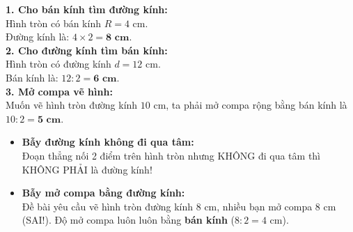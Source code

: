 \documentclass[12pt,a4paper]{article}
\begin{document}
\vspace{-2.5mm}
\noindent
\begin{minipage}[t]{0.49\textwidth}\vspace{0pt}
\begin{tcolorbox}[
  enhanced,
  colback=green!4!white,
  colframe=green!60!black,
  arc=2mm, boxrule=0.8pt,
  left=2mm, right=2mm, top=1.8mm, bottom=1.8mm,
  title={\footnotesize\bfseries\color{white}\faCheckCircle\ Ví dụ thực hành chuẩn mực}
]
{\footnotesize
\textbf{1. Cho bán kính tìm đường kính:}\\
Hình tròn có bán kính $R = 4\text{ cm}$.\\
Đường kính là: $4 \times 2 = \mathbf{8\text{ cm}}$.\\
\textbf{2. Cho đường kính tìm bán kính:}\\
Hình tròn có đường kính $d = 12\text{ cm}$.\\
Bán kính là: $12 : 2 = \mathbf{6\text{ cm}}$.\\
\textbf{3. Mở compa vẽ hình:}\\
Muốn vẽ hình tròn đường kính $10\text{ cm}$, ta phải mở compa rộng bằng bán kính là $10 : 2 = \mathbf{5\text{ cm}}$.
}
\end{tcolorbox}
\end{minipage}
\hfill
\begin{minipage}[t]{0.49\textwidth}\vspace{0pt}
\begin{tcolorbox}[
  enhanced,
  colback=red!4!white,
  colframe=red!70!black,
  arc=2mm, boxrule=0.8pt,
  left=2mm, right=2mm, top=1.8mm, bottom=1.8mm,
  title={\footnotesize\bfseries\color{white}\faExclamationTriangle\ Mẹo tránh bẫy trắc nghiệm}
]
{\footnotesize
\begin{itemize}\setlength{\itemsep}{1.5pt}\setlength{\leftskip}{-2.5mm}
  \item \textbf{Bẫy đường kính không đi qua tâm:}\\
  Đoạn thẳng nối 2 điểm trên hình tròn nhưng KHÔNG đi qua tâm thì KHÔNG PHẢI là đường kính!
  \item \textbf{Bẫy mở compa bằng đường kính:}\\
  Đề bài yêu cầu vẽ hình tròn đường kính $8\text{ cm}$, nhiều bạn mở compa $8\text{ cm}$ (SAI!). Độ mở compa luôn luôn bằng \textbf{bán kính} ($8 : 2 = 4\text{ cm}$).
\end{itemize}
}
\end{tcolorbox}
\end{minipage}
\end{document}
